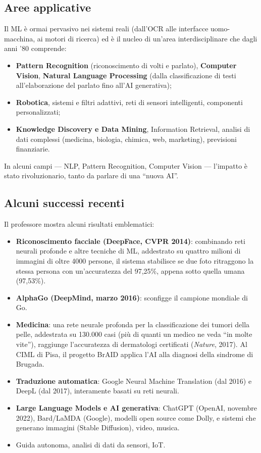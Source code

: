 \subsection{Aree applicative}\label{aree-applicative}

Il ML è ormai pervasivo nei sistemi reali (dall'OCR alle interfacce
uomo-macchina, ai motori di ricerca) ed è il nucleo di un'area
interdisciplinare che dagli anni '80 comprende:

\begin{itemize}
\tightlist
\item
  \textbf{Pattern Recognition} (riconoscimento di volti e parlato),
  \textbf{Computer Vision}, \textbf{Natural Language Processing} (dalla
  classificazione di testi all'elaborazione del parlato fino all'AI
  generativa);
\item
  \textbf{Robotica}, sistemi e filtri adattivi, reti di sensori
  intelligenti, componenti personalizzati;
\item
  \textbf{Knowledge Discovery e Data Mining}, Information Retrieval,
  analisi di dati complessi (medicina, biologia, chimica, web,
  marketing), previsioni finanziarie.
\end{itemize}

In alcuni campi --- NLP, Pattern Recognition, Computer Vision ---
l'impatto è stato rivoluzionario, tanto da parlare di una ``nuova AI''.

\subsection{Alcuni successi recenti}\label{alcuni-successi-recenti}

Il professore mostra alcuni risultati emblematici:

\begin{itemize}
\tightlist
\item
  \textbf{Riconoscimento facciale (DeepFace, CVPR 2014)}: combinando
  reti neurali profonde e altre tecniche di ML, addestrato su quattro
  milioni di immagini di oltre 4000 persone, il sistema stabilisce se
  due foto ritraggono la stessa persona con un'accuratezza del 97,25\%,
  appena sotto quella umana (97,53\%).
\item
  \textbf{AlphaGo (DeepMind, marzo 2016)}: sconfigge il campione
  mondiale di Go.
\item
  \textbf{Medicina}: una rete neurale profonda per la classificazione
  dei tumori della pelle, addestrata su 130.000 casi (più di quanti un
  medico ne veda ``in molte vite''), raggiunge l'accuratezza di
  dermatologi certificati (\emph{Nature}, 2017). Al CIML di Pisa, il
  progetto BrAID applica l'AI alla diagnosi della sindrome di Brugada.
\item
  \textbf{Traduzione automatica}: Google Neural Machine Translation (dal
  2016) e DeepL (dal 2017), interamente basati su reti neurali.
\item
  \textbf{Large Language Models e AI generativa}: ChatGPT (OpenAI,
  novembre 2022), Bard/LaMDA (Google), modelli open source come Dolly, e
  sistemi che generano immagini (Stable Diffusion), video, musica.
\item
  Guida autonoma, analisi di dati da sensori, IoT.
\end{itemize}

